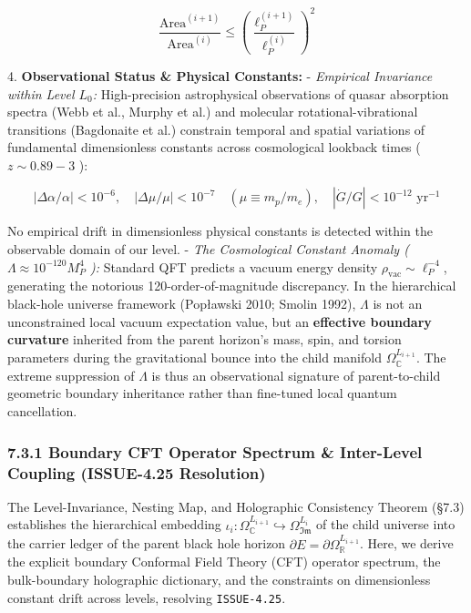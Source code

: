 \documentclass[11pt,a4paper]{article}
\theoremstyle{definition}
\theoremstyle{remark}
\begin{document}
\begin{equation}
\boxed{\frac{\mathrm{Area}^{(i+1)}}{\mathrm{Area}^{(i)}} \le \left(\frac{\ell_P^{(i+1)}}{\ell_P^{(i)}}\right)^2}
\end{equation}


4. \textbf{Observational Status \& Physical Constants:}
- \textit{Empirical Invariance within Level $L_0$:} High-precision astrophysical observations of quasar absorption spectra (Webb et al., Murphy et al.) and molecular rotational-vibrational transitions (Bagdonaite et al.) constrain temporal and spatial variations of fundamental dimensionless constants across cosmological lookback times ( $z \sim 0.89 - 3$ ):


\begin{equation}
|\Delta \alpha / \alpha| < 10^{-6}, \quad |\Delta \mu / \mu| < 10^{-7} \quad (\mu \equiv m_p / m_e), \quad |\dot{G}/G| < 10^{-12} \text{ yr}^{-1}
\end{equation}


No empirical drift in dimensionless physical constants is detected within the observable domain of our level.
- \textit{The Cosmological Constant Anomaly ( $\Lambda \approx 10^{-120} M_P^4$ ):} Standard QFT predicts a vacuum energy density $\rho_{\text{vac}} \sim \ell_P^{-4}$, generating the notorious 120-order-of-magnitude discrepancy. In the hierarchical black-hole universe framework (Popławski 2010; Smolin 1992), $\Lambda$ is not an unconstrained local vacuum expectation value, but an \textbf{effective boundary curvature} inherited from the parent horizon's mass, spin, and torsion parameters during the gravitational bounce into the child manifold $\Omega_\mathbb{C}^{L_{i+1}}$. The extreme suppression of $\Lambda$ is thus an observational signature of parent-to-child geometric boundary inheritance rather than fine-tuned local quantum cancellation.
\subsubsection{7.3.1 Boundary CFT Operator Spectrum \& Inter-Level Coupling (ISSUE-4.25 Resolution)}

The Level-Invariance, Nesting Map, and Holographic Consistency Theorem (\S 7.3) establishes the hierarchical embedding $\iota_i: \Omega_\mathbb{C}^{L_{i+1}} \hookrightarrow \Omega_{\mathfrak{Im}}^{L_i}$ of the child universe into the carrier ledger of the parent black hole horizon $\partial E = \partial \Omega_\mathbb{R}^{L_{i+1}}$. Here, we derive the explicit boundary Conformal Field Theory (CFT) operator spectrum, the bulk-boundary holographic dictionary, and the constraints on dimensionless constant drift across levels, resolving \texttt{ISSUE-4.25}.
\end{document}
